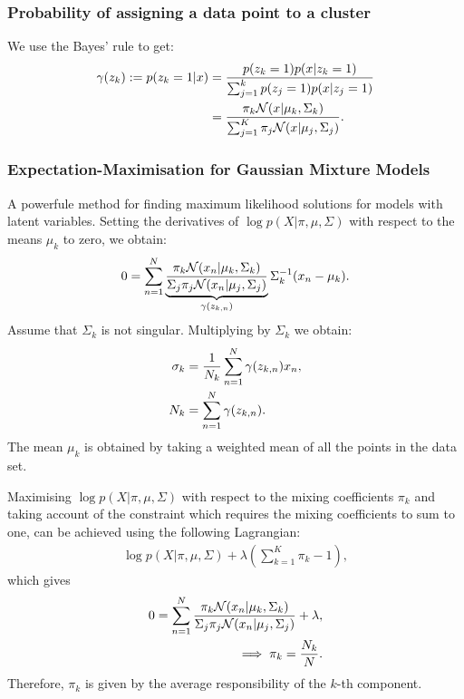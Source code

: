 \subsubsection{Probability of assigning a data point to a cluster}
We use the Bayes' rule to get:
\begin{align*}
    \gamma(z_k) := p(z_k=1|x) &= {p(z_k=1)p(x|z_k=1) \over \sum_{j=1}^k p(z_j=1) p(x|z_j=1)}\\
     &= {\pi_k \mathcal N(x|\mu_k, \Sigma_k)\over \sum_{j=1}^K \pi_j \mathcal N(x|\mu_j, \Sigma_j)}.
\end{align*}
\subsubsection{Expectation-Maximisation for Gaussian Mixture Models}
A powerfule method for finding maximum likelihood solutions for models with latent variables. Setting the derivatives of $\log p(X|\pi, \mu, \Sigma)$ with respect to the means $\mu_k$ to zero, we obtain:
\begin{align*}
    0 = \sum_{n=1}^N \underbrace{\pi_k \mathcal N(x_n|\mu_k, \Sigma_k) \over \Sigma_j \pi_j \mathcal N(x_n|\mu_j, \Sigma_j)}_{\gamma(z_{k,n})} \Sigma_k^{-1} (x_n-\mu_k).
\end{align*}
Assume that $\Sigma_k$ is not singular. Multiplying by $\Sigma_k$ we obtain:
\begin{align*}
    \sigma_k &= {1\over N_k} \sum_{n=1}^N \gamma(z_{k,n})x_n,\\
    N_k &= \sum_{n=1}^N \gamma(z_{k,n}).
\end{align*}
The mean $\mu_k$ is obtained by taking a weighted mean of all the points in the data set.

Maximising $\log p(X|\pi, \mu, \Sigma)$ with respect to the mixing coefficients $\pi_k$ and taking account of the constraint which requires the mixing coefficients to sum to one, can be achieved using the following Lagrangian:
\begin{align*}
    \log p(X|\pi, \mu, \Sigma) + \lambda \left( \sum_{k=1}^K\pi_k-1\right),
\end{align*}
which gives 
\begin{align*}
    0 = \sum_{n=1}^N {\pi_k \mathcal N(x_n|\mu_k, \Sigma_k) \over \Sigma_j \pi_j \mathcal N(x_n|\mu_j, \Sigma_j)}+\lambda,\\
    \implies \pi_k = {N_k\over N}.
\end{align*}
Therefore, $\pi_k$ is given by the average responsibility of the $k$-th component.

